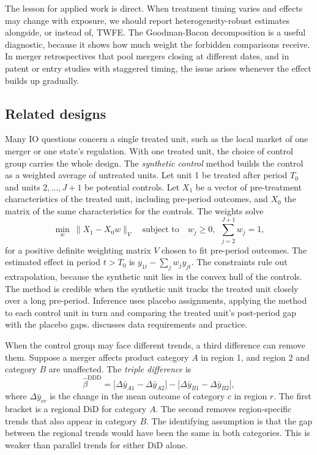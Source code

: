The lesson for applied work is direct. When treatment timing varies and effects may change with exposure, we
should report heterogeneity-robust estimates alongside, or instead of, TWFE. The Goodman-Bacon decomposition is a
useful diagnostic, because it shows how much weight the forbidden comparisons receive. In merger retrospectives that
pool mergers closing at different dates, and in patent or entry studies with staggered timing, the issue arises
whenever the effect builds up gradually.

\subsection{Related designs}\label{sec:A-did-related}

Many IO questions concern a single treated unit, such as the local market of one merger or one state's regulation.
With one treated unit, the choice of control group carries the whole design. The \emph{synthetic control} method
\citep{AbadieGardeazabal2003,AbadieDiamondHainmueller2010} builds the control as a weighted average of untreated
units. Let unit 1 be treated after period $T_0$ and units $2,\dots,J+1$ be potential controls. Let $X_1$ be a vector
of pre-treatment characteristics of the treated unit, including pre-period outcomes, and $X_0$ the matrix of the same
characteristics for the controls. The weights solve
\begin{equation*}
\min_{w}\ \big\|X_1-X_0w\big\|_V\quad\text{subject to}\quad w_j\ge0,\ \ \sum_{j=2}^{J+1}w_j=1,
\end{equation*}
for a positive definite weighting matrix $V$ chosen to fit pre-period outcomes. The estimated effect in period
$t>T_0$ is $y_{1t}-\sum_jw_jy_{jt}$. The constraints rule out extrapolation, because the synthetic unit lies in the
convex hull of the controls. The method is credible when the synthetic unit tracks the treated unit closely over a
long pre-period. Inference uses placebo assignments, applying the method to each control unit in turn and comparing
the treated unit's post-period gap with the placebo gaps. \citet{Abadie2021} discusses data requirements and
practice.

When the control group may face different trends, a third difference can remove them. Suppose a merger affects
product category $A$ in region 1, and region 2 and category $B$ are unaffected. The \emph{triple difference} is
\begin{equation*}
\hat\beta^{\mathrm{DDD}}=\big[\Delta\bar y_{A1}-\Delta\bar y_{A2}\big]-\big[\Delta\bar y_{B1}-\Delta\bar y_{B2}\big],
\end{equation*}
where $\Delta\bar y_{cr}$ is the change in the mean outcome of category $c$ in region $r$. The first bracket is a
regional DiD for category $A$. The second removes region-specific trends that also appear in category $B$. The
identifying assumption is that the gap between the regional trends would have been the same in both categories.
This is weaker than parallel trends for either DiD alone.

